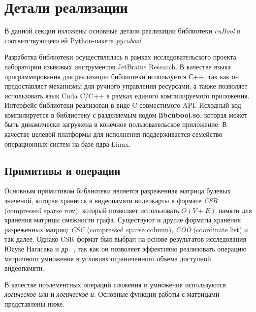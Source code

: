 \section{Детали реализации}

В данной секции изложены основные детали реализации библиотеки \textit{cuBool} и соответствующего ей Python-пакета \textit{pycubool}.

Разработка библиотеки осуществлялась в рамках исследовательского проекта лаборатории языковых инструментов JetBrains Research. В качестве языка программирования для реализации библиотеки используется С++, 
так как он предоставляет механизмы для ручного управления ресурсами, 
а также позволяет использовать язык Cuda C/C++ в рамках единого компилируемого приложения. 
Интерфейс библиотеки реализован в виде C-совместимого API.
Исходный код компилируется в библиотеку с разделяемым кодом \textbf{libcubool.so}, 
которая может быть динамически загружена в конечное пользовательское приложение. 
В качестве целевой платформы для исполнения поддерживается семейство операционных систем на базе ядра Linux.

\subsection{Примитивы и операции}

Основным примитивом библиотеки является разреженная матрица булевых значений, 
которая хранится в видеопамяти видеокарты в формате \textit{CSR} (compressed sparse row), 
который позволяет использовать $O(V + E)$ памяти для хранения матрицы смежности графа. 
Существуют и другие форматы хранения разреженных матриц: \textit{CSC} (compressed sparse column), \textit{COO} (coordinate list) и так далее. 
Однако CSR формат был выбран на основе результатов исследования Юсуке Нагасака и др.~\cite{inproceedings:spgemm_mem_saving_for_nvidia}, 
так как он позволяет эффективно реализовать операцию матричного умножения в условиях ограниченного объема доступной видеопамяти. 

В качестве поэлементных операций сложения и умножения используются \textit{логическое-или} и \textit{логическое-и}. 
Основные функции работы с матрицами представлены ниже.


